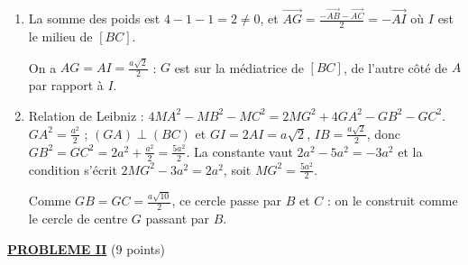 \begin{description}
\begin{description}
\begin{enumerate}
\begin{enumerate}
			\end{enumerate}
		\end{enumerate}
		\item[II.]
		\begin{enumerate}
			\item {}
				La somme des poids est $4 - 1 - 1 = 2 \neq 0$, et
				$\overrightarrow{AG} = \frac{-\overrightarrow{AB} - \overrightarrow{AC}}{2} = -\overrightarrow{AI}$ où $I$ est le milieu de $[BC]$.
				\par\noindent{}
				On a $AG = AI = \frac{a\sqrt{2}}{2}$ : $G$ est sur la médiatrice de $[BC]$, de l'autre côté de $A$ par rapport à $I$.
			\item {}
				Relation de Leibniz : $4MA^2 - MB^2 - MC^2 = 2MG^2 + 4GA^2 - GB^2 - GC^2$.
				$GA^2 = \frac{a^2}{2}$ ; $(GA) \perp (BC)$ et $GI = 2AI = a\sqrt{2}$, $IB = \frac{a\sqrt{2}}{2}$, donc $GB^2 = GC^2 = 2a^2 + \frac{a^2}{2} = \frac{5a^2}{2}$.
				La constante vaut $2a^2 - 5a^2 = -3a^2$ et la condition s'écrit $2MG^2 - 3a^2 = 2a^2$, soit $MG^2 = \frac{5a^2}{2}$.
				\par\noindent{}
				Comme $GB = GC = \frac{a\sqrt{10}}{2}$, ce cercle passe par $B$ et $C$ : on le construit comme le cercle de centre $G$ passant par $B$.
				\begin{center}
				\end{center}
		\end{enumerate}
	\end{description}
\end{description}
\noindent \underline{\textsc{\textbf{PROBLEME II}}} (9 points)
